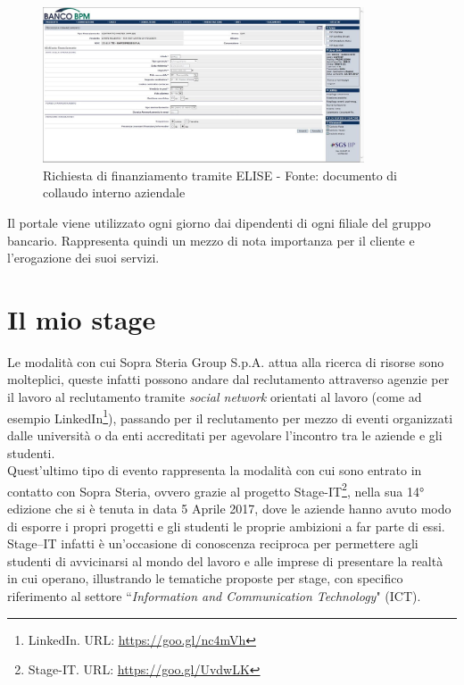 	\begin{figure}[H]
		\centering
	   	\includegraphics[width=0.85\textwidth]{immagini/RichiestaFinanziamento}
	   	\caption{Richiesta di finanziamento tramite ELISE - Fonte: documento di collaudo interno aziendale}
	\end{figure}
	
	Il portale viene utilizzato ogni giorno dai dipendenti di ogni filiale del gruppo bancario. Rappresenta quindi un mezzo di nota importanza per il cliente	e l'erogazione dei suoi servizi.

		
\section{Il mio stage}

Le modalità con cui Sopra Steria Group S.p.A. attua alla ricerca di risorse sono molteplici, queste infatti possono andare dal reclutamento attraverso agenzie per il lavoro al reclutamento tramite \textit{social network} orientati al lavoro (come ad esempio LinkedIn\footnote{LinkedIn. URL: \url{https://goo.gl/nc4mVh}}), passando per il reclutamento per mezzo di eventi organizzati dalle università o da enti accreditati per agevolare l'incontro tra le aziende e gli studenti.\\

Quest'ultimo tipo di evento rappresenta la modalità con cui sono entrato in contatto con Sopra Steria, ovvero grazie al progetto Stage-IT\footnote{Stage-IT. URL: \url{https://goo.gl/UvdwLK}}, nella sua \ang{14} edizione che si è tenuta in data 5 Aprile 2017, dove le aziende hanno avuto modo di esporre i propri progetti e gli studenti le proprie ambizioni a far parte di essi. Stage–IT infatti è un'occasione di conoscenza reciproca per permettere agli studenti di avvicinarsi al mondo del lavoro e alle imprese di presentare la realtà in cui operano, illustrando le tematiche proposte per stage, con specifico riferimento al settore “\textit{Information and Communication Technology}" (ICT).\\

